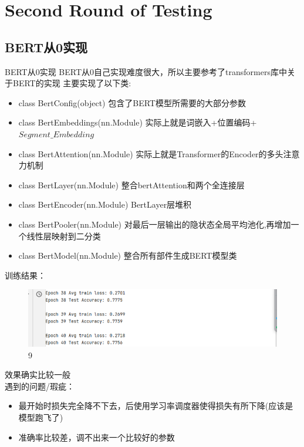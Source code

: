 \documentclass[UTF8]{ctexbeamer}
\begin{document}
\section{Second Round of Testing \uppercase\expandafter{}}
\subsection{BERT从0实现}
\begin{frame}[allowframebreaks]{BERT从0实现}
BERT从0自己实现难度很大，所以主要参考了transformers库中关于BERT的实现
主要实现了以下类:
\begin{itemize}
	\item class BertConfig(object) 包含了BERT模型所需要的大部分参数
	\item class BertEmbeddings(nn.Module) 实际上就是词嵌入+位置编码+$Segment\_Embedding$
	\item class BertAttention(nn.Module) 实际上就是Transformer的Encoder的多头注意力机制
	\item class BertLayer(nn.Module) 整合bertAttention和两个全连接层\newpage
	\item class BertEncoder(nn.Module) BertLayer层堆积
	\item class BertPooler(nn.Module) 对最后一层输出的隐状态全局平均池化,再增加一个线性层映射到二分类
	\item class BertModel(nn.Module) 整合所有部件生成BERT模型类
\end{itemize}
训练结果：
\begin{figure}[H] %
	\centering %
	\includegraphics[scale=0.3]{bert.png} %
	\caption{9}
\end{figure}
效果确实比较一般\\\newpage
遇到的问题/瑕疵：
\begin{itemize}
	\item 最开始时损失完全降不下去，后使用学习率调度器使得损失有所下降(应该是模型跑飞了)
	\item 准确率比较差，调不出来一个比较好的参数 
\end{itemize}
\end{frame}
\end{document}
